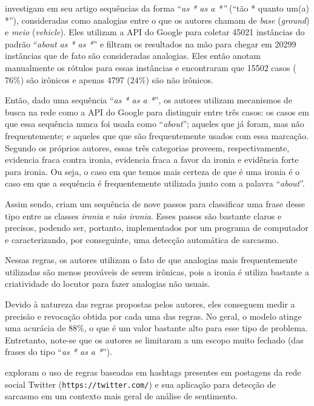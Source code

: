 \cite{veale:2010} investigam em seu artigo sequências da forma ``\textit{as * as
a *''} (``tão * quanto um(a) *''), consideradas como analogias entre o que os
autores chamam de \textit{base} (\textit{ground}) e \textit{meio}
(\textit{vehicle}). Eles utilizam a API do Google para coletar 45021 instâncias
do padrão ``\textit{about as * as *}'' e filtram os resultados na mão para
chegar em 20299 instâncias que de fato são consideradas analogias. Eles então
anotam manualmente os rótulos para essas instâncias e encontraram que 15502
casos ($76\%$) são irônicos e apenas 4797 ($24\%$) são não irônicos.

Então, dado uma sequência ``\textit{as * as a *}'', os autores utilizam
mecanismos de busca na rede como a API do Google para distinguir entre três
casos: os casos em que essa sequência nunca foi usada como ``\textit{about}'';
aqueles que já foram, mas não frequentemente; e aqueles que que são
frequentemente usados com essa marcação. Segundo os próprios autores, essas três
categorias proveem, respectivamente, evidencia fraca contra ironia, evidencia
fraca a favor da ironia e evidência forte para ironia. Ou seja, o caso em que
temos mais certeza de que é uma ironia é o caso em que a sequência é
frequentemente utilizada junto com a palavra ``\textit{about}''.

Assim sendo, \cite{veale:2010} criam um sequência de nove passos para
classificar uma frase desse tipo entre as classes \textit{ironia} e \textit{não
ironia}. Esses passos são bastante claros e precisos, podendo ser, portanto,
implementados por um programa de computador e caracterizando, por conseguinte,
uma detecção automática de sarcasmo.

Nessas regras, os autores utilizam o fato de que analogias mais frequentemente
utilizadas são menos prováveis de serem irônicas, pois a ironia é utiliza
bastante a criatividade do locutor para fazer analogias não usuais.

Devido à natureza das regras propostas pelos autores, eles conseguem medir a
precisão e revocação obtida por cada uma das regras. No geral, o modelo atinge
uma acurácia de $88\%$, o que é um valor bastante alto para esse tipo de
problema. Entretanto, note-se que os autores se limitaram a um escopo muito
fechado (das frases do tipo ``\textit{as * as a *}'').

\cite{maynard-greenwood:2014:cares} exploram o uso de regras baseadas em
hashtags presentes em postagens da rede social Twitter
(\texttt{https://twitter.com/}) e sua aplicação para detecção de sarcasmo em um
contexto mais geral de análise de sentimento.

